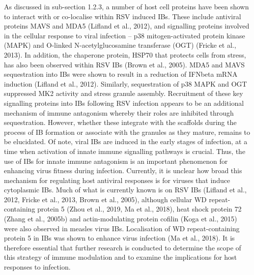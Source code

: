 As discussed in sub-section 1.2.3, a number of host cell proteins have been shown to interact with or co-localise within RSV induced IBs. These include antiviral proteins MAVS and MDA5 (Lifland et al., 2012), and signalling proteins involved in the cellular response to viral infection – p38 mitogen-activated protein kinase (MAPK) and O-linked N-acetylglucosamine transferase (OGT) (Fricke et al., 2013). In addition, the chaperone protein, HSP70 that protects cells from stress, has also been observed within RSV IBs (Brown et al., 2005). MDA5 and MAVS sequestration into IBs were shown to result in a reduction of IFNbeta mRNA induction (Lifland et al., 2012). Similarly, sequestration of p38 MAPK and OGT suppressed MK2 activity and stress granule assembly. Recruitment of these key signalling proteins into IBs following RSV infection appears to be an additional mechanism of immune antagonism whereby their roles are inhibited through sequestration. However, whether these integrate with the scaffolds during the process of IB formation or associate with the granules as they mature, remains to be elucidated. Of note, viral IBs are induced in the early stages of infection, at a time when activation of innate immune signalling pathways is crucial. Thus, the use of IBs for innate immune antagonism is an important phenomenon for enhancing virus fitness during infection. Currently, it is unclear how broad this mechanism for regulating host antiviral responses is for viruses that induce cytoplasmic IBs. Much of what is currently known is on RSV IBs (Lifland et al., 2012, Fricke et al., 2013, Brown et al., 2005), although cellular WD repeat-containing protein 5 (Zhou et al., 2019, Ma et al., 2018), heat shock protein 72 (Zhang et al., 2005b) and actin-modulating protein cofilin (Koga et al., 2015) were also observed in measles virus IBs. Localisation of WD repeat-containing protein 5 in IBs was shown to enhance virus infection (Ma et al., 2018). It is therefore essential that further research is conducted to determine the scope of this strategy of immune modulation and to examine the implications for host responses to infection.

